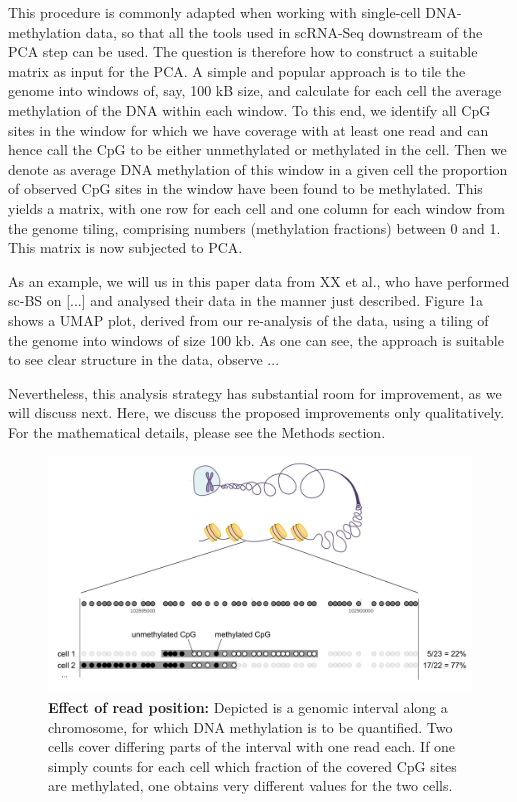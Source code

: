 \documentclass[twocolumn,10pt]{article}
\begin{document}
This procedure is commonly adapted when working with single-cell DNA-methylation data, so that all the tools used in scRNA-Seq downstream of the PCA step can be used. The question is therefore how to construct a suitable matrix as input for the PCA. A simple and popular approach is to tile the genome into windows of, say, 100 kB size, and calculate for each cell the average methylation of the DNA within each window. To this end, we identify all CpG sites in the window for which we have coverage with at least one read and can hence call the CpG to be either unmethylated or methylated in the cell. Then we denote as average DNA methylation of this window in a given cell the proportion of observed CpG sites in the window have been found to be methylated. This yields a matrix, with one row for each cell and one column for each window from the genome tiling, comprising numbers (methylation fractions) between 0 and 1. This matrix is now subjected to PCA.

As an example, we will us in this paper data from XX et al., who have performed sc-BS on [...] and analysed their data in the manner just described. Figure 1a shows a UMAP plot, derived from our re-analysis of the data, using a tiling of the genome into windows of size 100 kb. As one can see, the approach is suitable to see clear structure in the data, observe ...

Nevertheless, this analysis strategy has substantial room for improvement, as we will discuss next. Here, we discuss the proposed improvements only qualitatively. For the mathematical details, please see the Methods section. 

\begin{figure}
\includegraphics[width=\columnwidth]{need_for_relative_meth.png}
\caption{\textbf{Effect of read position:} Depicted is a genomic interval along a chromosome, for which DNA methylation is to be quantified. Two cells cover differing parts of the interval with one read each. If one simply counts for each cell which fraction of the covered CpG sites are methylated, one obtains very different values for the two cells.}
\end{figure}
\end{document}
